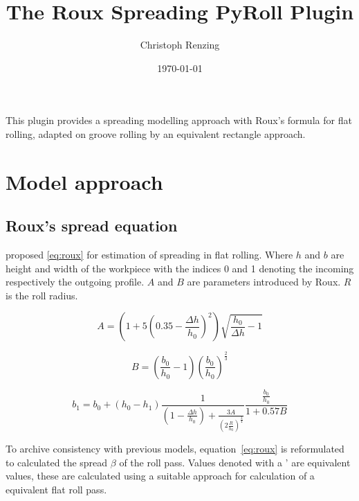 \documentclass[11pt]{PyRollDocs}
\begin{document}
    \title{The Roux Spreading PyRoll Plugin}
    \author{Christoph Renzing}
    \date{\today}

    \maketitle

    This plugin provides a spreading modelling approach with Roux's formula for flat rolling, adapted on groove rolling by an equivalent rectangle approach.


    \section{Model approach}\label{sec:model-approach}

    \subsection{Roux's spread equation}\label{subsec:roux's-spread-equation}

    \textcite{Roux1939} proposed \autoref{eq:roux} for estimation of spreading in flat rolling.
    Where $h$ and $b$ are height and width of the workpiece with the indices 0 and 1 denoting the incoming respectively the outgoing profile.
    $A$ and $B$ are parameters introduced by Roux.
    $R$ is the roll radius.


    \begin{equation}
        A = \left( 1 + 5 \left( 0.35 - \frac{\Delta h}{h_0}\right)^2 \right) \sqrt{\frac{h_0}{\Delta h} - 1}
        \label{eq:roux-parameter-a}
    \end{equation}

    \begin{equation}
        B = \left( \frac{b_0}{h_0} - 1 \right) \left( \frac{b_0}{h_0} \right)^{\frac{2}{3}}
        \label{eq:roux-parameter-b}
    \end{equation}

    \begin{equation}
        b_1 = b_0 + \left( h_0 - h_1 \right) \frac{1}{\left( 1 - \frac{\Delta h}{h_0} \right) + \frac{3 A}{\left( 2 \frac{R}{h_0} \right)^{\frac{3}{4}}}} \frac{\frac{b_0}{h_0}}{1 + 0.57 B}
        \label{eq:roux}
    \end{equation}

    To archive consistency with previous models, equation~\ref{eq:roux} is reformulated to calculated the spread $\beta$ of the roll pass.
    Values denoted with a ' are equivalent values, these are calculated using a suitable approach for calculation of a equivalent flat roll pass.
\end{document}
